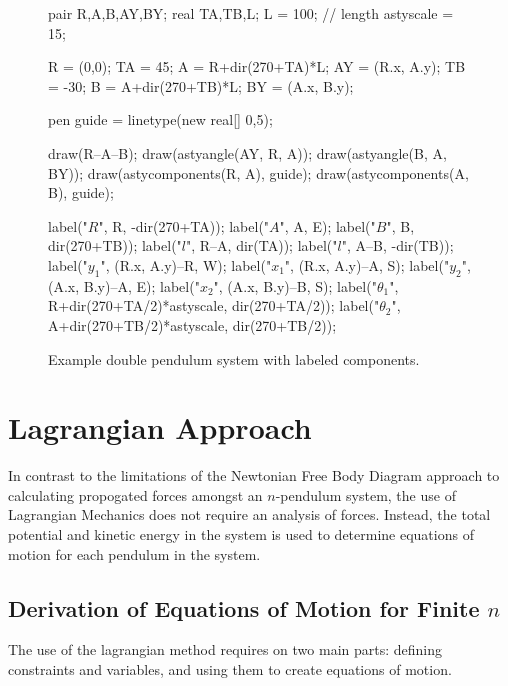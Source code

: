 \documentclass{article}
\begin{document}
\begin{figure}[h]
	\caption{Example double pendulum system with labeled components.}
	\label{fig:1}
	\begin{center}
		\begin{asy}
		pair R,A,B,AY,BY;
		real TA,TB,L;
		L = 100; // length
		astyscale = 15;

		R = (0,0);
		TA = 45;
		A = R+dir(270+TA)*L;
		AY = (R.x, A.y);
		TB = -30;
		B = A+dir(270+TB)*L;
		BY = (A.x, B.y);

		pen guide = linetype(new real[] {0,5});

		draw(R--A--B);
		draw(astyangle(AY, R, A));
		draw(astyangle(B, A, BY));
		draw(astycomponents(R, A), guide);
		draw(astycomponents(A, B), guide);

		label("$R$", R, -dir(270+TA));
		label("$A$", A, E);
		label("$B$", B, dir(270+TB));
		label("$l$", R--A, dir(TA));
		label("$l$", A--B, -dir(TB));
		label("$y_1$", (R.x, A.y)--R, W);
		label("$x_1$", (R.x, A.y)--A, S);
		label("$y_2$", (A.x, B.y)--A, E);
		label("$x_2$", (A.x, B.y)--B, S);
		label("$\theta_1$", R+dir(270+TA/2)*astyscale, dir(270+TA/2));
		label("$\theta_2$", A+dir(270+TB/2)*astyscale, dir(270+TB/2));
		\end{asy}
	\end{center}
\end{figure}

\section{Lagrangian Approach}
In contrast to the limitations of the Newtonian Free Body Diagram approach to calculating propogated forces amongst an $n$-pendulum system, the use of Lagrangian Mechanics does not require an analysis of forces. Instead, the total potential and kinetic energy in the system is used to determine equations of motion for each pendulum in the system.
\subsection{Derivation of Equations of Motion for Finite \texorpdfstring{$n$}{n}}
The use of the lagrangian method requires on two main parts: defining constraints and variables, and using them to create equations of motion.
\end{document}
